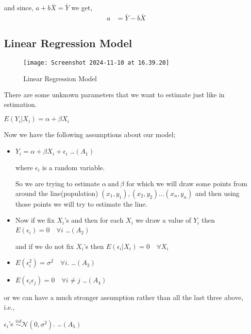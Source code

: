 \documentclass[12pt,a4paper]{article}
\begin{document}
 and since, \(a+b\bar{X} = \bar{Y}\)  we get, 
 \begin{align*}
    a&= \bar{Y}-b\bar{X}
\end{align*}
 \subsection*{Linear Regression Model} 
 \begin{figure}[ht]
     \centering
     \texttt{[image: Screenshot 2024-11-10 at 16.39.20]}
     \caption{Linear Regression Model}
     \label{Label}
 \end{figure}
     
 There are some unknown parameters that we want to estimate just like in estimation.

 \(E(Y_{i}|X_{i})= \alpha + \beta X_{i}\)
 
 Now we have the following assumptions about our model;
 \begin{itemize}
 
 \item \(Y_{i}= \alpha + \beta X_{i} + \epsilon_{i}\) \qquad \ldots \((A_1)\)
 
 where \(\epsilon_{i}\) is a random variable.
 
 So we are trying to estimate \(\alpha \ \text{and} \ \beta\)  for which we will draw some points from around the line(population) \((x_{1},y_{1}),(x_{2},y_{2})\ldots(x_{n},y_{n})\)   and then using those points we will try to estimate the line.

 \item Now if we fix \(X_{i}\)'s and then for each \(X_{i}\) we draw a value of \(Y_{i}\) then \(E(\epsilon_{i})=0 \quad \forall i\) \qquad \ldots \((A_2)\)
 
 and if we do not fix \(X_{i}\)'s then \(E(\epsilon_{i}|X_{i})=0  \quad \forall X_{i}\)   
 
 \item \(E(\epsilon_{i}^2)=\sigma^2 \quad \forall i\). 
 \qquad \ldots \((A_3)\) 
 \item \(E(\epsilon_{i}\epsilon_{j})=0 \quad \forall i \neq j\) \qquad \ldots \((A_4)\)  
\end{itemize}
or we can have a much stronger assumption rather than all the last three above, i.e.,

\(\epsilon_{i}\)'s \(\overset{iid}{\sim} \mathcal{N}(0,\sigma^2)\). \qquad \ldots \((A_5)\)
\end{document}
